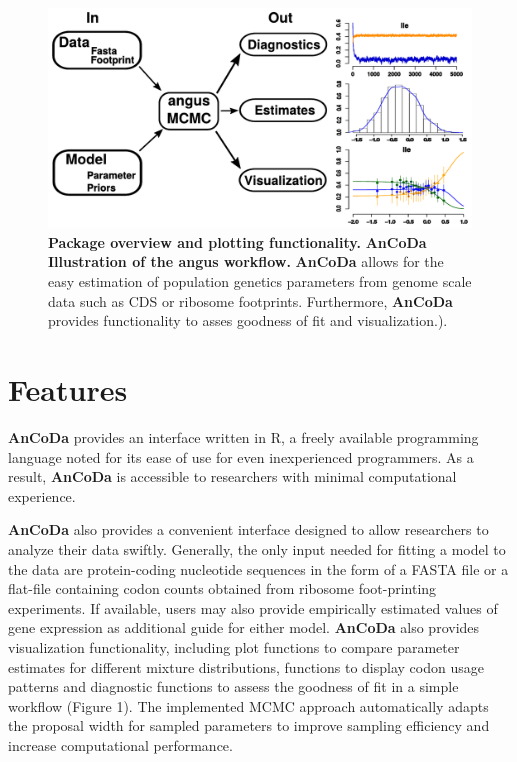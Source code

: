 \documentclass{bioinfo}
\newcommand{\package}{\textbf{AnCoDa }} %
\begin{document}
\begin{figure}[!tpb]
\centering
 \includegraphics[width=5in]{workflow_croped.pdf}
\vspace{-0.2cm}
\caption{\textbf{Package overview and plotting functionality.} \package \textbf{Illustration of the angus workflow.} 
\package allows for the easy estimation of population genetics parameters from genome scale data such as CDS or ribosome footprints. 
Furthermore, \package provides functionality to asses goodness of fit and visualization.). 
}
\label{fig:plotbin}
\end{figure}

\section*{Features}
\package provides an interface written in R, a freely available programming language noted for its ease of use for even inexperienced programmers. 
As a result, \package is accessible to researchers with minimal computational experience. 

\package also provides a convenient interface designed to allow researchers to analyze their data swiftly. 
Generally, the only input needed for fitting a model to the data are protein-coding nucleotide sequences in the form of a FASTA file or a flat-file containing codon counts obtained from ribosome foot-printing experiments. 
If available, users may also provide empirically estimated values of gene expression as additional guide for either model.
\package also provides visualization functionality, including plot functions to compare parameter estimates for different mixture distributions, functions to display codon usage patterns and diagnostic functions to assess the goodness of fit in a simple workflow (Figure 1).
The implemented MCMC approach automatically adapts the proposal width for sampled parameters to improve sampling efficiency and increase computational performance. 
\end{document}
